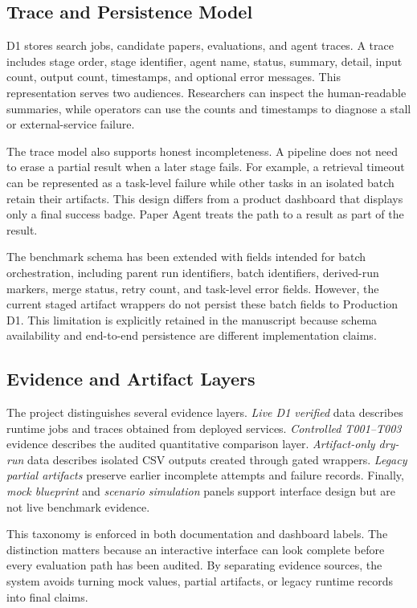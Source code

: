 \documentclass[10pt,twocolumn]{article}
\begin{document}
\subsection{Trace and Persistence Model}
D1 stores search jobs, candidate papers, evaluations, and agent traces. A trace includes stage order, stage identifier, agent name, status, summary, detail, input count, output count, timestamps, and optional error messages. This representation serves two audiences. Researchers can inspect the human-readable summaries, while operators can use the counts and timestamps to diagnose a stall or external-service failure.

The trace model also supports honest incompleteness. A pipeline does not need to erase a partial result when a later stage fails. For example, a retrieval timeout can be represented as a task-level failure while other tasks in an isolated batch retain their artifacts. This design differs from a product dashboard that displays only a final success badge. Paper Agent treats the path to a result as part of the result.

The benchmark schema has been extended with fields intended for batch orchestration, including parent run identifiers, batch identifiers, derived-run markers, merge status, retry count, and task-level error fields. However, the current staged artifact wrappers do not persist these batch fields to Production D1. This limitation is explicitly retained in the manuscript because schema availability and end-to-end persistence are different implementation claims.

\subsection{Evidence and Artifact Layers}
The project distinguishes several evidence layers. \textit{Live D1 verified} data describes runtime jobs and traces obtained from deployed services. \textit{Controlled T001--T003} evidence describes the audited quantitative comparison layer. \textit{Artifact-only dry-run} data describes isolated CSV outputs created through gated wrappers. \textit{Legacy partial artifacts} preserve earlier incomplete attempts and failure records. Finally, \textit{mock blueprint} and \textit{scenario simulation} panels support interface design but are not live benchmark evidence.

This taxonomy is enforced in both documentation and dashboard labels. The distinction matters because an interactive interface can look complete before every evaluation path has been audited. By separating evidence sources, the system avoids turning mock values, partial artifacts, or legacy runtime records into final claims.
\end{document}
